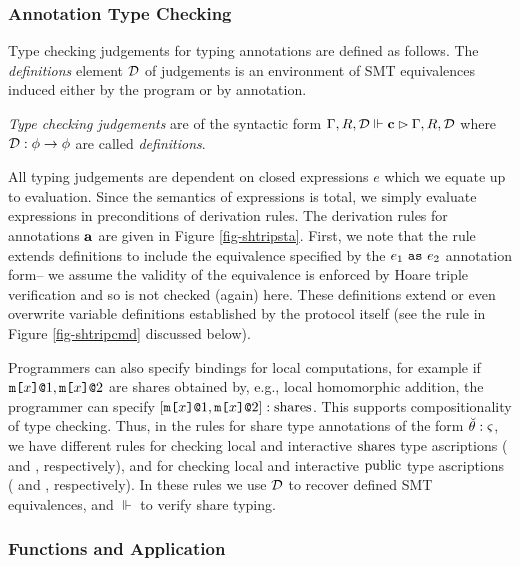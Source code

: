 \subsubsection{Annotation Type Checking}

Type checking judgements for typing annotations are defined as follows.
The \emph{definitions} element $\mathcal{D}$ of judgements is an environment
of SMT equivalences induced either by the program or by annotation. 
\begin{definition}
  \emph{Type checking judgements} are of the syntactic form
  $\Gamma, R, \mathcal{D} \Vdash \mathbf{c} \rhd \Gamma, R, \mathcal{D}$
  where $\mathcal{D} : \phi \rightarrow \phi$ are called
  \emph{definitions}.
\end{definition}

All typing judgements are dependent on closed expressions $e$ which we
equate up to evaluation. Since the semantics of expressions is total,
we simply evaluate expressions in preconditions of derivation
rules. The derivation rules for annotations $\mathbf{a}$ are given in Figure
\ref{fig-shtripsta}. First, we note that the  rule
extends definitions to include the equivalence specified by the $e_1
\ \texttt{as}\  e_2$ annotation form-- we assume the validity of the equivalence
is enforced by Hoare triple verification and so is not checked (again)
here.  These definitions extend or even overwrite variable definitions
established by the protocol itself (see the  rule in
Figure \ref{fig-shtripcmd} discussed below).

Programmers can also specify bindings for local computations, for
example if $\texttt{m[}x\texttt{]}\texttt{@}1,\texttt{m[}x\texttt{]}\texttt{@}2$ are shares obtained by, e.g., local
homomorphic addition, the programmer can specify
$[\texttt{m[}x\texttt{]}\texttt{@}1,\texttt{m[}x\texttt{]}\texttt{@}2] : \mathrm{shares}$. This supports compositionality of
type checking. Thus, in the rules for share type annotations of the
form $\breve{\theta} : \varsigma$, we have different rules for checking local and interactive
$\mathrm{shares}$ type ascriptions ( and ,
respectively), and for checking local and interactive
$\mathrm{public}$ type ascriptions ( and ,
respectively). In these rules we use $\mathcal{D}$ to recover defined
SMT equivalences, and $\Vdash$ to verify share typing.

\subsubsection{Functions and Application}


